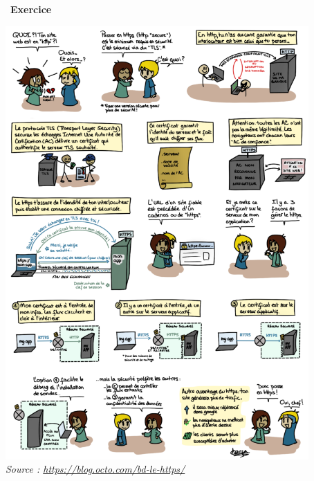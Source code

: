 \documentclass[
  11pt,
]{article}
\newcounter{exo}
\newenvironment{exercice}[1]
{\par \medskip   \addtocounter{exo}{1} \noindent  
\begin{bclogo}[arrondi =0.1,   noborder = true, logo=\bccrayon, marge=4]{~\textbf{Exercice} \textbf{\theexo} {\itshape #1} }  \par}
{
\end{bclogo}
 \par \bigskip }
\begin{document}
\begin{exercice}{}
\includegraphics[width=0.87\textwidth,height=\textheight]{images/tls-3-717x1024.png}\\

\emph{Source : \url{https://blog.octo.com/bd-le-https/}}

\end{exercice}
\end{document}
